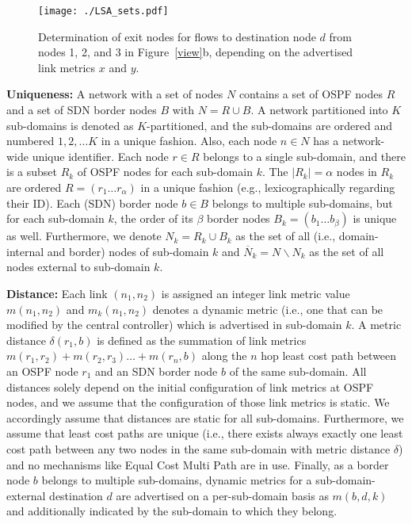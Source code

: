 \documentclass[journal]{IEEEtran}
\begin{document}
\begin{figure}[t] \center
\texttt{[image: ./LSA\_sets.pdf]}
\caption{Determination of exit nodes for flows to destination node $d$ from nodes 1, 2, and 3 in Figure~\ref{view}b, depending on the advertised link metrics $x$ and $y$.}
\label{LSA_sets} \end{figure}






\vspace{1mm}\noindent \textbf{Uniqueness:} A network with a set of nodes $N$ contains a set of  OSPF nodes $R$ and a set of SDN border nodes $B$ with $N = R \cup B$. A network partitioned into $K$ sub-domains is denoted as $K$-partitioned, and the sub-domains are ordered and numbered $1, 2, \ldots K$ in a unique fashion. Also, each node $n\in N$ has a network-wide unique identifier. Each node $r\in R$ belongs to a single sub-domain, and there is a subset $R_k$ of OSPF nodes for each sub-domain $k$. The $|R_k| = \alpha$ nodes in $R_k$ are ordered $R=(r_1 \ldots r_\alpha)$ in a unique fashion (e.g., lexicographically regarding their ID). Each (SDN) border node $b\in B$ belongs to multiple sub-domains, but for each sub-domain $k$, the order of its $\beta$ border nodes $B_k=(b_1 \ldots b_\beta)$ is unique as well. Furthermore, we denote $N_k=R_k\cup B_k$ as the set of all (i.e., domain-internal and border) nodes of sub-domain $k$ and $\overline{N}_k=N \backslash N_k$ as the set of all nodes external to sub-domain $k$.

\vspace{1mm}\noindent \textbf{Distance:} Each link $(n_1,n_2)$ is assigned an integer link metric value $m(n_1,n_2)$ and $m_k(n_1,n_2)$ denotes a dynamic metric (i.e., one that can be modified by the central controller) which is advertised in sub-domain $k$. A metric distance $\delta(r_1,b)$ is defined as the summation of link metrics $m(r_1,r_2)+m(r_2,r_3)\ldots +m(r_n,b)$ along the $n$ hop least cost path between an OSPF node $r_1$ and an SDN border node $b$ of the same sub-domain. All distances solely depend on the initial configuration of link metrics at OSPF nodes, and we assume that the configuration of those link metrics is static. We accordingly assume that distances are static for all sub-domains. Furthermore, we assume that least cost paths are unique (i.e., there exists always exactly one least cost path between any two nodes in the same sub-domain with metric distance $\delta$) and no mechanisms like Equal Cost Multi Path are in use. Finally, as a border node $b$ belongs to multiple sub-domains, dynamic metrics for a sub-domain-external destination $d$ are advertised on a per-sub-domain basis as $m(b,d,k)$ and additionally indicated by the sub-domain to which they belong.
\end{document}
